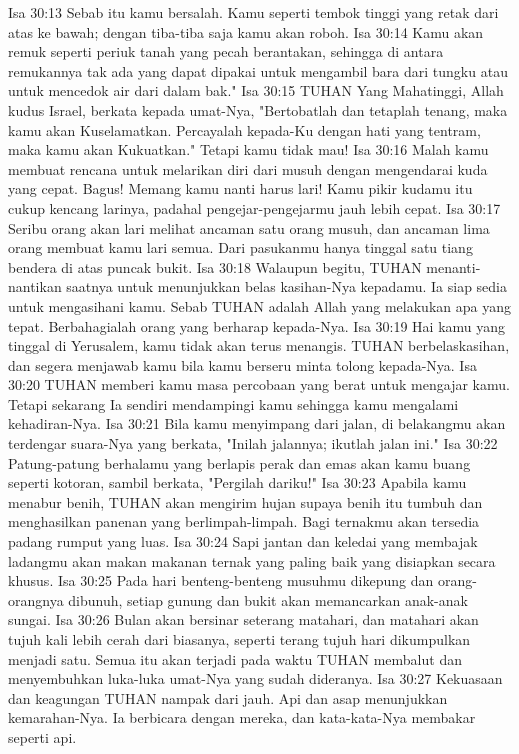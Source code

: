 Isa 30:13  Sebab itu kamu bersalah. Kamu seperti tembok tinggi yang retak dari atas ke bawah; dengan tiba-tiba saja kamu akan roboh.
Isa 30:14  Kamu akan remuk seperti periuk tanah yang pecah berantakan, sehingga di antara remukannya tak ada yang dapat dipakai untuk mengambil bara dari tungku atau untuk mencedok air dari dalam bak."
Isa 30:15  TUHAN Yang Mahatinggi, Allah kudus Israel, berkata kepada umat-Nya, "Bertobatlah dan tetaplah tenang, maka kamu akan Kuselamatkan. Percayalah kepada-Ku dengan hati yang tentram, maka kamu akan Kukuatkan." Tetapi kamu tidak mau!
Isa 30:16  Malah kamu membuat rencana untuk melarikan diri dari musuh dengan mengendarai kuda yang cepat. Bagus! Memang kamu nanti harus lari! Kamu pikir kudamu itu cukup kencang larinya, padahal pengejar-pengejarmu jauh lebih cepat.
Isa 30:17  Seribu orang akan lari melihat ancaman satu orang musuh, dan ancaman lima orang membuat kamu lari semua. Dari pasukanmu hanya tinggal satu tiang bendera di atas puncak bukit.
Isa 30:18  Walaupun begitu, TUHAN menanti-nantikan saatnya untuk menunjukkan belas kasihan-Nya kepadamu. Ia siap sedia untuk mengasihani kamu. Sebab TUHAN adalah Allah yang melakukan apa yang tepat. Berbahagialah orang yang berharap kepada-Nya.
Isa 30:19  Hai kamu yang tinggal di Yerusalem, kamu tidak akan terus menangis. TUHAN berbelaskasihan, dan segera menjawab kamu bila kamu berseru minta tolong kepada-Nya.
Isa 30:20  TUHAN memberi kamu masa percobaan yang berat untuk mengajar kamu. Tetapi sekarang Ia sendiri mendampingi kamu sehingga kamu mengalami kehadiran-Nya.
Isa 30:21  Bila kamu menyimpang dari jalan, di belakangmu akan terdengar suara-Nya yang berkata, "Inilah jalannya; ikutlah jalan ini."
Isa 30:22  Patung-patung berhalamu yang berlapis perak dan emas akan kamu buang seperti kotoran, sambil berkata, "Pergilah dariku!"
Isa 30:23  Apabila kamu menabur benih, TUHAN akan mengirim hujan supaya benih itu tumbuh dan menghasilkan panenan yang berlimpah-limpah. Bagi ternakmu akan tersedia padang rumput yang luas.
Isa 30:24  Sapi jantan dan keledai yang membajak ladangmu akan makan makanan ternak yang paling baik yang disiapkan secara khusus.
Isa 30:25  Pada hari benteng-benteng musuhmu dikepung dan orang-orangnya dibunuh, setiap gunung dan bukit akan memancarkan anak-anak sungai.
Isa 30:26  Bulan akan bersinar seterang matahari, dan matahari akan tujuh kali lebih cerah dari biasanya, seperti terang tujuh hari dikumpulkan menjadi satu. Semua itu akan terjadi pada waktu TUHAN membalut dan menyembuhkan luka-luka umat-Nya yang sudah dideranya.
Isa 30:27  Kekuasaan dan keagungan TUHAN nampak dari jauh. Api dan asap menunjukkan kemarahan-Nya. Ia berbicara dengan mereka, dan kata-kata-Nya membakar seperti api.
